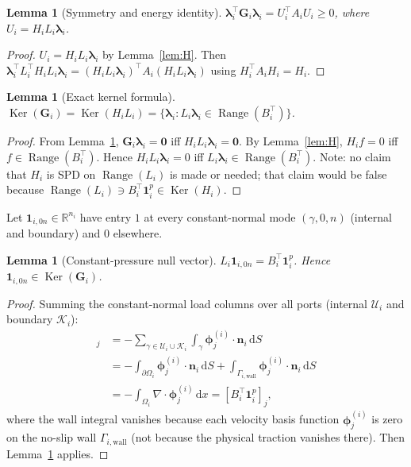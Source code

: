 \documentclass[11pt,a4paper]{article}
\newtheorem{lemma}[assumption]{Lemma}
\newcommand{\R}{\mathbb{R}}
\newcommand{\pore}[1]{\Omega_{#1}}
\newcommand{\normal}{\bm{n}}
\newcommand{\trac}{\bm{\lambda}}
\newcommand{\DtN}{\mathbf{G}}
\newcommand{\one}{\mathbf{1}}
\newcommand{\zero}{\bm{0}}
\newcommand{\Range}{\operatorname{Range}}
\newcommand{\Ker}{\operatorname{Ker}}
\begin{document}
\begin{lemma}[Symmetry and energy identity]\label{lem:energy}
  $\trac_i^\top \DtN_i \trac_i = U_i^\top A_i U_i \ge 0$,
  where $U_i = H_i L_i \trac_i$.
\end{lemma}

\begin{proof}
  $U_i = H_i L_i \trac_i$ by Lemma~\ref{lem:H}.
  Then $\trac_i^\top L_i^\top H_i L_i \trac_i
   = (H_i L_i\trac_i)^\top A_i (H_i L_i\trac_i)$
  using $H_i^\top A_i H_i = H_i$.
\end{proof}

\begin{lemma}[Exact kernel formula]\label{lem:kernel-formula}
  $\Ker(\DtN_i) = \Ker(H_i L_i)
   = \{\trac_i : L_i\trac_i \in \Range(B_i^\top)\}$.
\end{lemma}

\begin{proof}
  From Lemma~\ref{lem:energy}, $\DtN_i\trac_i = \zero$ iff
  $H_i L_i \trac_i = \zero$.
  By Lemma~\ref{lem:H}, $H_i f = 0$ iff $f \in \Range(B_i^\top)$.
  Hence $H_i L_i \trac_i = 0$ iff $L_i \trac_i \in \Range(B_i^\top)$.
  Note: no claim that $H_i$ is SPD on $\Range(L_i)$ is made or needed;
  that claim would be false because
  $\Range(L_i) \ni B_i^\top\one_i^p \in \Ker(H_i)$.
\end{proof}

Let $\one_{i,0n} \in \R^{n_i}$ have entry $1$ at every constant-normal
mode $(\gamma,0,n)$ (internal and boundary) and $0$ elsewhere.

\begin{lemma}[Constant-pressure null vector]\label{lem:constant}
  $L_i \one_{i,0n} = B_i^\top \one_i^p$.
  Hence $\one_{i,0n} \in \Ker(\DtN_i)$.
\end{lemma}

\begin{proof}
  Summing the constant-normal load columns over all ports
  (internal $\mathcal{U}_i$ and boundary $\mathcal{K}_i$):
  \begin{align*}
    [L_i\one_{i,0n}]_j
    &= -\sum_{\gamma\in\mathcal{U}_i\cup\mathcal{K}_i}
       \int_{\gamma} \bm{\phi}_j^{(i)}\!\cdot\!\normal_i\,\mathrm{d}S \\
    &= -\int_{\partial\pore{i}} \bm{\phi}_j^{(i)}\!\cdot\!\normal_i\,\mathrm{d}S
       + \int_{\Gamma_{i,\text{wall}}} \bm{\phi}_j^{(i)}\!\cdot\!\normal_i\,\mathrm{d}S \\
    &= -\int_{\pore{i}} \nabla\!\cdot\!\bm{\phi}_j^{(i)}\,\mathrm{d}x
     = [B_i^\top\one_i^p]_j,
  \end{align*}
  where the wall integral vanishes because each velocity basis function
  $\bm{\phi}_j^{(i)}$ is zero on the no-slip wall $\Gamma_{i,\text{wall}}$
  (not because the physical traction vanishes there).
  Then Lemma~\ref{lem:kernel-formula} applies.
\end{proof}
\end{document}
